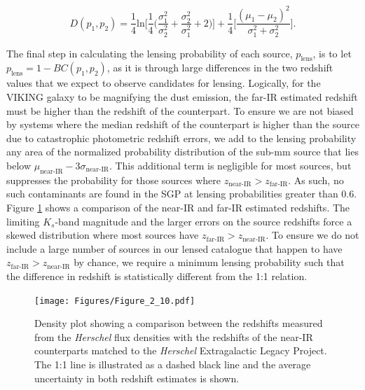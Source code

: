 \begin{equation}
    D(p_1, p_2) = \frac{1}{4}\textrm{ln}\Bigg[\frac{1}{4}\Bigg(\frac{\sigma_1^2}{\sigma_2^2}+\frac{\sigma_2^2}{\sigma_1^2}+2\Bigg)\Bigg] + \frac{1}{4}\Bigg[\frac{(\mu_1 - \mu_2)^2}{\sigma_1^2 + \sigma_2^2}\Bigg].
\label{eq:Bhattacharyya_distance_gaussian}
\end{equation}

The final step in calculating the lensing probability of each source, $p_{\textrm{lens}}$, is to let $p_{\textrm{lens}} = 1 - BC(p_1, p_2)$, as it is through large differences in the two redshift values that we expect to observe candidates for lensing. Logically, for the VIKING galaxy to be magnifying the dust emission, the far-IR estimated redshift must be higher than the redshift of the counterpart. To ensure we are not biased by systems where the median redshift of the counterpart is higher than the source due to catastrophic photometric redshift errors, we add to the lensing probability any area of the normalized probability distribution of the sub-mm source that lies below $\mu_\textrm{near-IR} - 3\sigma_\textrm{near-IR}$. This additional term is negligible for most sources, but suppresses the probability for those sources where $z_\textrm{near-IR} > z_\textrm{far-IR}$. As such, no such contaminants are found in the SGP at lensing probabilities greater than $0.6$. Figure \ref{fig:lens_probability_scatter} shows a comparison of the near-IR and far-IR estimated redshifts. The limiting $K_s$-band magnitude and the larger errors on the source redshifts force a skewed distribution where most sources have $z_\textrm{far-IR} > z_\textrm{near-IR}$. To ensure we do not include a large number of sources in our lensed catalogue that happen to have $z_\textrm{far-IR} > z_\textrm{near-IR}$ by chance, we require a minimum lensing probability such that the difference in redshift is statistically different from the 1:1 relation.

\begin{figure}
    \centering
    \texttt{[image: Figures/Figure\_2\_10.pdf]}
    \caption[Comparison of source and counterpart photometric redshifts]{Density plot showing a comparison between the redshifts measured from the \textit{Herschel} flux densities with the redshifts of the near-IR counterparts matched to the \textit{Herschel} Extragalactic Legacy Project. The 1:1 line is illustrated as a dashed black line and the average uncertainty in both redshift estimates is shown.}
    \label{fig:lens_probability_scatter}
\end{figure}

